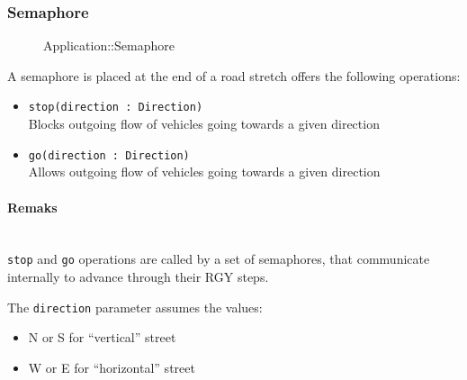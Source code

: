 \subsubsection{Semaphore}
\begin{figure}[h]
\centering
{}
\caption{Application::Semaphore}
\end{figure}
\FloatBarrier
A semaphore is placed at the end of a road stretch offers the following operations:
\begin{itemize}
	\item \texttt{stop(direction : Direction)}
	\\Blocks outgoing flow of vehicles going towards a given direction
	\item \texttt{go(direction : Direction)}
	\\Allows outgoing flow of vehicles going towards a given direction
\end{itemize}
\paragraph{Remaks}
\ \\\texttt{stop} and \texttt{go} operations are called by a set of semaphores, that communicate internally to advance through their RGY steps.

The \texttt{direction} parameter assumes the values:
\begin{itemize}
	\item N or S  for “vertical” street
	\item W or E for “horizontal” street
\end{itemize}